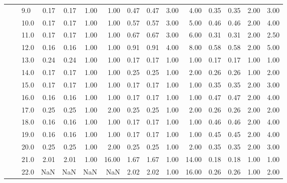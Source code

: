 \begin{tabular}{lllrrrrrrrrrrrr}
       &     & 9.0  &       0.17 &      0.17 & 1.00 &   1.00 &       0.47 &      0.47 &  3.00 &   4.00 &       0.35 &      0.35 &  2.00 &   3.00 \\
       &     & 10.0 &       0.17 &      0.17 & 1.00 &   1.00 &       0.57 &      0.57 &  3.00 &   5.00 &       0.46 &      0.46 &  2.00 &   4.00 \\
       &     & 11.0 &       0.17 &      0.17 & 1.00 &   1.00 &       0.67 &      0.67 &  3.00 &   6.00 &       0.31 &      0.31 &  2.00 &   2.50 \\
       &     & 12.0 &       0.16 &      0.16 & 1.00 &   1.00 &       0.91 &      0.91 &  4.00 &   8.00 &       0.58 &      0.58 &  2.00 &   5.00 \\
       &     & 13.0 &       0.24 &      0.24 & 1.00 &   1.00 &       0.17 &      0.17 &  1.00 &   1.00 &       0.17 &      0.17 &  1.00 &   1.00 \\
       &     & 14.0 &       0.17 &      0.17 & 1.00 &   1.00 &       0.25 &      0.25 &  1.00 &   2.00 &       0.26 &      0.26 &  1.00 &   2.00 \\
       &     & 15.0 &       0.17 &      0.17 & 1.00 &   1.00 &       0.17 &      0.17 &  1.00 &   1.00 &       0.35 &      0.35 &  2.00 &   3.00 \\
       &     & 16.0 &       0.16 &      0.16 & 1.00 &   1.00 &       0.17 &      0.17 &  1.00 &   1.00 &       0.47 &      0.47 &  2.00 &   4.00 \\
       &     & 17.0 &       0.25 &      0.25 & 1.00 &   2.00 &       0.25 &      0.25 &  1.00 &   2.00 &       0.26 &      0.26 &  2.00 &   2.00 \\
       &     & 18.0 &       0.16 &      0.16 & 1.00 &   1.00 &       0.17 &      0.17 &  1.00 &   1.00 &       0.46 &      0.46 &  2.00 &   4.00 \\
       &     & 19.0 &       0.16 &      0.16 & 1.00 &   1.00 &       0.17 &      0.17 &  1.00 &   1.00 &       0.45 &      0.45 &  2.00 &   4.00 \\
       &     & 20.0 &       0.25 &      0.25 & 1.00 &   2.00 &       0.25 &      0.25 &  1.00 &   2.00 &       0.35 &      0.35 &  2.00 &   3.00 \\
       &     & 21.0 &       2.01 &      2.01 & 1.00 &  16.00 &       1.67 &      1.67 &  1.00 &  14.00 &       0.18 &      0.18 &  1.00 &   1.00 \\
       &     & 22.0 &        NaN &       NaN &  NaN &    NaN &       2.02 &      2.02 &  1.00 &  16.00 &       0.26 &      0.26 &  1.00 &   2.00 \\

\end{tabular}
